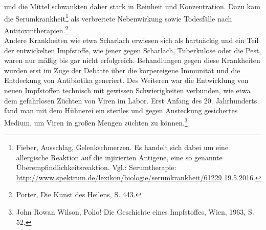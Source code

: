 \documentclass[
    a4paper,
    12pt,
    hyphens,
    chapterprefix=true,
    headheight=33pt,
    footheight=29pt,
    headings=optiontohead, %
]{scrartcl}
\begin{document}
und die Mittel schwankten daher stark in Reinheit und Konzentration. Dazu kam die Serumkrankheit\footnote{Fieber, Ausschlag,
Gelenkschmerzen. Es handelt sich dabei um eine allergische Reaktion auf die injizierten Antigene, eine so genannte
Überempfindlichkeitsreaktion. Vgl.: Serumtherapie: \url{http://www.spektrum.de/lexikon/biologie/serumkrankheit/61229} 19.5.2016.}
als verbreitete Nebenwirkung sowie Todesfälle nach Antitoxintherapien.\footnote{Porter, Die Kunst des Heilens, S. 443.}\\
Andere Krankheiten wie etwa Scharlach erwiesen sich als hartnäckig und ein Teil der entwickelten Impfstoffe, wie jener gegen Scharlach, Tuberkulose oder die Pest, waren nur mäßig bis gar nicht erfolgreich. Behandlungen gegen diese Krankheiten wurden erst im Zuge der Debatte über die körpereigene Immunität und die Entdeckung von Antibiotika generiert. Des Weiteren war die Entwicklung von neuen Impfstoffen technisch mit gewissen Schwierigkeiten verbunden, wie etwa dem gefahrlosen Züchten von Viren im Labor. Erst Anfang des 20. Jahrhunderts fand man mit dem Hühnerei ein steriles und gegen Ansteckung gesichertes Medium, um Viren in großen Mengen züchten zu können.\footnote{John Rowan Wilson, Polio! Die Geschichte eines Impfstoffes, Wien, 1963, S. 52.}

\newpage
\end{document}
